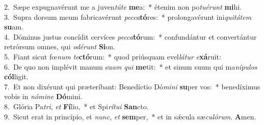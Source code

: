 {2.~}Sæpe expugnavérunt me a juven\textit{tú}\textit{te} \textbf{me}a:~* étenim non po\textit{tu}\textit{é}\textit{runt} \textbf{mi}hi.\\
{3.~}Supra dorsum meum fabricavérunt \textit{pec}\textit{ca}\textbf{tó}res:~* prolongavérunt ini\textit{qui}\textit{tá}\textit{tem} \textbf{su}am.\\
{4.~}Dóminus justus concídit cervíces \textit{pec}\textit{ca}\textbf{tó}rum:~* confundántur et convertántur retrórsum omnes, qui \textit{o}\textit{dé}\textit{runt} \textbf{Si}on.\\
{5.~}Fiant sicut fœ\textit{num} \textit{te}\textbf{ctó}rum:~* quod priúsquam evel\textit{lá}\textit{tur} \textit{e}\textbf{xá}ruit:\\
{6.~}De quo non implévit manum su\textit{am} \textit{qui} \textbf{me}tit:~* et sinum suum qui ma\textit{ní}\textit{pu}\textit{los} \textbf{cól}ligit.\\
{7.~}Et non dixérunt qui præteríbant: Benedíctio Dó\textit{mi}\textit{ni} \textbf{su}per vos:~* benedíximus vobis in \textit{nó}\textit{mi}\textit{ne} \textbf{Dó}mini.\\
{8.~}Glória Pa\textit{tri}, \textit{et} \textbf{Fí}lio,~* et Spi\textit{rí}\textit{tu}\textit{i} \textbf{San}cto.\\
{9.~}Sicut erat in princípio, et \textit{nunc}, \textit{et} \textbf{sem}per,~* et in sǽcula sæ\textit{cu}\textit{ló}\textit{rum}. \textbf{A}men.\\
